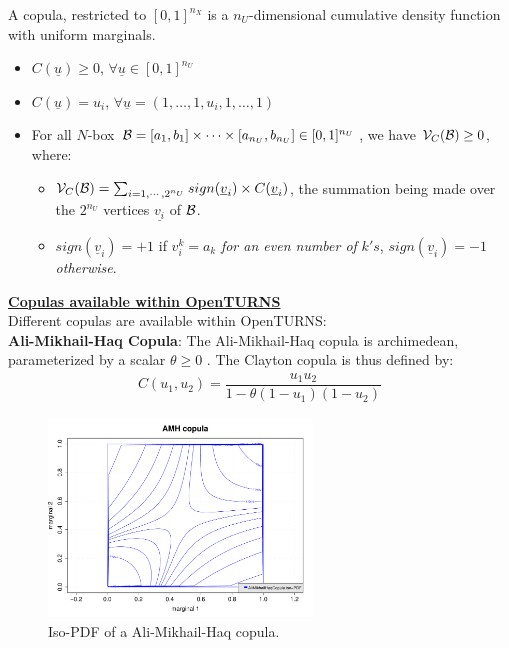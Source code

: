 {  A copula, restricted to $[0,1]^{n_X}$ is a $n_U$-dimensional cumulative density function with uniform marginals.

  \begin{itemize}
  \item $C(\underline{u}) \geq 0$,  $\forall \underline{u} \in [0,1]^{n_U}$
  \item $C(\underline{u}) = u_i$, $\forall \underline{u}=(1,\ldots,1,u_i,1,\ldots,1)$
  \item For all $N$-box ${\mathcal B} = [a_1,b_1] \times \cdots \times [a_{n_U},b_{n_U}] \in [0,1]^{n_U}$, we have ${\mathcal V}_C({\mathcal B}) \geq 0$,     where:
    \begin{itemize}
    \item       ${\mathcal V}_C({\mathcal B}) = \sum_{i=1,\cdots, 2^{n_U}} sign(\underline{v}_i) \times C(\underline{v}_i)$, the summation being made over the $2^{n_U}$ vertices $\underline{v_i}$ of ${\mathcal B}$.
    \item       $sign(\underline{v}_i)= +1$ if $v_i^k = a_k$ \textit{for an even number of} $k's$, $sign(\underline{v}_i)= -1$ \textit{otherwise}.\\
    \end{itemize}
  \end{itemize}






  \underline{\textbf{Copulas available within OpenTURNS}}\\

  Different copulas are available within OpenTURNS:\\

  {\bf Ali-Mikhail-Haq Copula}: The Ali-Mikhail-Haq copula is archimedean, parameterized by a scalar $\theta \geq 0 $ . The Clayton copula is thus defined by:
  \begin{align*}
    C(u_1, u_2) = \displaystyle \dfrac{u_1u_2}{1-\theta(1-u_1)(1-u_2)}
  \end{align*}

  \begin{figure}[H]
    \begin{center}
      \includegraphics[width=7cm]{Figures/AliMikhailHaqCopula.pdf}
      \caption{Iso-PDF of a Ali-Mikhail-Haq  copula.}
    \end{center}
  \end{figure}


}
